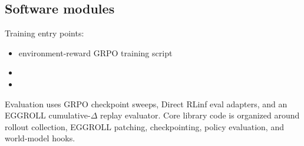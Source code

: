 \subsection{Software modules}
Training entry points:
\begin{itemize}
  \item environment-reward GRPO training script
  \item {}
  \item {}
\end{itemize}
Evaluation uses GRPO checkpoint sweeps, Direct RLinf eval adapters, and an EGGROLL cumulative-$\Delta$ replay evaluator. Core library code is organized around rollout collection, EGGROLL patching, checkpointing, policy evaluation, and world-model hooks.
